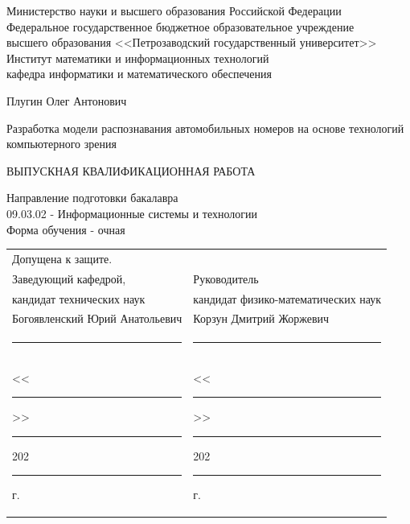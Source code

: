 \documentclass[a4paper,12pt]{article}
\renewcommand{\baselinestretch}{1.50}
\begin{document}

\thispagestyle{empty}
{ \large
\begin{center}
\renewcommand{\baselinestretch}{1.4}
Министерство науки и высшего образования Российской Федерации\\
\bigskip
Федеральное государственное бюджетное образовательное учреждение \\ 
высшего образования <<Петрозаводский государственный университет>>\\
\bigskip
Институт математики и информационных технологий \\
кафедра информатики и математического обеспечения

\end{center}
}
\vspace{3\bigskipamount}%

\vspace{2\bigskipamount}

\begin{center}
\large
Плугин Олег Антонович
\end{center}
\medskip%

\begin{center}
\renewcommand{\baselinestretch}{1.2}
\Large \sc Разработка модели распознавания автомобильных номеров на основе технологий компьютерного зрения
\end{center}
\medskip%


\begin{center}
\large
ВЫПУСКНАЯ КВАЛИФИКАЦИОННАЯ РАБОТА
\end{center}
\medskip%

\begin{center}
\large
Направление подготовки бакалавра \\
09.03.02 - Информационные системы и технологии \\
Форма обучения - очная
\end{center}

\vspace{4\bigskipamount}%

\begin{tabular}{ l l }
    Допущена к защите. & \\
    Заведующий кафедрой, & \hspace{2cm} Руководитель \\
    кандидат технических наук & \hspace{2cm} \parbox[t]{6cm}{кандидат физико-математических наук} \\
    Богоявленский Юрий Анатольевич & \hspace{2cm} Корзун Дмитрий Жоржевич \\
    \noindent\rule{6cm}{0.2pt} & \hspace{2cm} \noindent\rule{6cm}{0.2pt} \\
    <<\noindent\rule{1cm}{0.2pt}>>\noindent\rule{3cm}{0.2pt}202\noindent\rule{0.3cm}{0.2pt} г. & \hspace{2cm}
    <<\noindent\rule{1cm}{0.2pt}>>\noindent\rule{3cm}{0.2pt}202\noindent\rule{0.3cm}{0.2pt} г.
\end{tabular}
\end{document}
